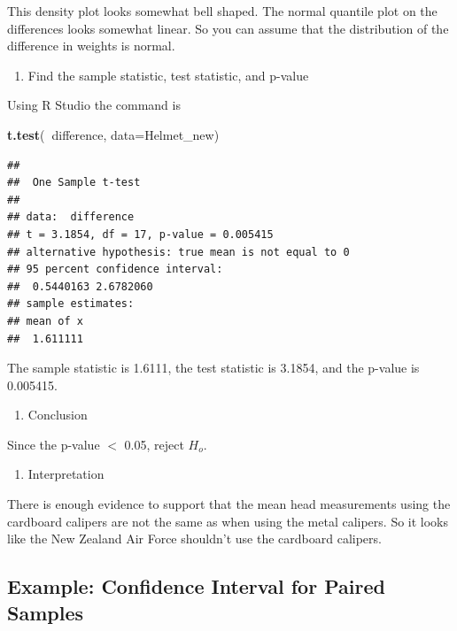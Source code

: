 \documentclass[
]{book}
\newenvironment{Shaded}{\begin{snugshade}}{\end{snugshade}}
\newcommand{\DataTypeTok}[1]{\textcolor[rgb]{0.13,0.29,0.53}{#1}}
\newcommand{\KeywordTok}[1]{\textcolor[rgb]{0.13,0.29,0.53}{\textbf{#1}}}
\newcommand{\NormalTok}[1]{#1}
\newcommand{\OperatorTok}[1]{\textcolor[rgb]{0.81,0.36,0.00}{\textbf{#1}}}
\providecommand{\tightlist}{%
  \setlength{\itemsep}{0pt}\setlength{\parskip}{0pt}}
\begin{document}
This density plot looks somewhat bell shaped. The normal quantile plot on the differences looks somewhat linear. So you can assume that the distribution of the difference in weights is normal.

\begin{enumerate}
\def\labelenumi{\arabic{enumi}.}
\setcounter{enumi}{3}
\tightlist
\item
  Find the sample statistic, test statistic, and p-value
\end{enumerate}

Using R Studio the command is

\begin{Shaded}
\begin{Highlighting}[]
\KeywordTok{t.test}\NormalTok{(}\OperatorTok{~}\NormalTok{difference, }\DataTypeTok{data=}\NormalTok{Helmet_new)}
\end{Highlighting}
\end{Shaded}

\begin{verbatim}
## 
##  One Sample t-test
## 
## data:  difference
## t = 3.1854, df = 17, p-value = 0.005415
## alternative hypothesis: true mean is not equal to 0
## 95 percent confidence interval:
##  0.5440163 2.6782060
## sample estimates:
## mean of x 
##  1.611111
\end{verbatim}

The sample statistic is 1.6111, the test statistic is 3.1854, and the p-value is 0.005415.

\begin{enumerate}
\def\labelenumi{\arabic{enumi}.}
\setcounter{enumi}{4}
\tightlist
\item
  Conclusion
\end{enumerate}

Since the p-value \(<\) 0.05, reject \(H_o\).

\begin{enumerate}
\def\labelenumi{\arabic{enumi}.}
\setcounter{enumi}{5}
\tightlist
\item
  Interpretation
\end{enumerate}

There is enough evidence to support that the mean head measurements using the cardboard calipers are not the same as when using the metal calipers. So it looks like the New Zealand Air Force shouldn't use the cardboard calipers.

\hypertarget{example-confidence-interval-for-paired-samples}{%
\subsection{Example: Confidence Interval for Paired Samples}\label{example-confidence-interval-for-paired-samples}}
\end{document}
